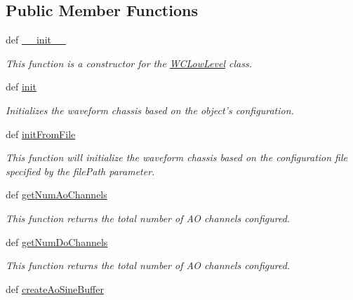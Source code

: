 \subsection*{Public Member Functions}
\begin{DoxyCompactItemize}
\item 
def \hyperlink{class_chassis_8git_1_1_waveform_chassis_1_1_w_c_low_level_a6f0482973d7a6e6633cbf59cfb19eb1e}{\-\_\-\-\_\-init\-\_\-\-\_\-}
\begin{DoxyCompactList}\small\item\em This function is a constructor for the \hyperlink{class_chassis_8git_1_1_waveform_chassis_1_1_w_c_low_level}{W\-C\-Low\-Level} class. \end{DoxyCompactList}\item 
def \hyperlink{class_chassis_8git_1_1_waveform_chassis_1_1_w_c_low_level_ae45db5514a77606b640824f9664173c3}{init}
\begin{DoxyCompactList}\small\item\em Initializes the waveform chassis based on the object's configuration. \end{DoxyCompactList}\item 
def \hyperlink{class_chassis_8git_1_1_waveform_chassis_1_1_w_c_low_level_aa8d0b1d9776158685f729497935f8e42}{init\-From\-File}
\begin{DoxyCompactList}\small\item\em This function will initialize the waveform chassis based on the configuration file specified by the file\-Path parameter. \end{DoxyCompactList}\item 
def \hyperlink{class_chassis_8git_1_1_waveform_chassis_1_1_w_c_low_level_a6e342cb07451502c8175cb22659c565f}{get\-Num\-Ao\-Channels}
\begin{DoxyCompactList}\small\item\em This function returns the total number of A\-O channels configured. \end{DoxyCompactList}\item 
def \hyperlink{class_chassis_8git_1_1_waveform_chassis_1_1_w_c_low_level_a7af297e40c59043b9b74825a1afda31c}{get\-Num\-Do\-Channels}
\begin{DoxyCompactList}\small\item\em This function returns the total number of A\-O channels configured. \end{DoxyCompactList}\item 
def \hyperlink{class_chassis_8git_1_1_waveform_chassis_1_1_w_c_low_level_ade62a9bbdeeb0d64da9c9302beb83013}{create\-Ao\-Sine\-Buffer}

\end{DoxyCompactItemize}
